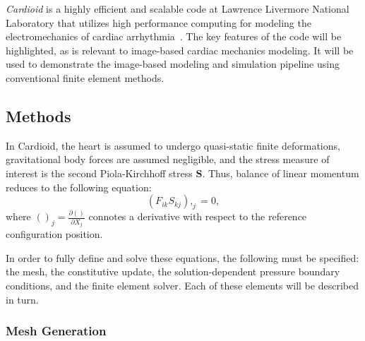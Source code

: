 \textit{Cardioid} is a highly efficient and scalable code at Lawrence Livermore National Laboratory that utilizes high performance computing for modeling the electromechanics of cardiac arrhythmia~\cite{richards_2013, gurev_2015}. The key features of the code will be highlighted, as is relevant to image-based cardiac mechanics modeling. It will be used to demonstrate the image-based modeling and simulation pipeline using conventional finite element methods.

\subsection{Methods}
\label{Methods}

In Cardioid, the heart is assumed to undergo quasi-static finite deformations, gravitational body forces are assumed negligible, and the stress measure of interest is the second Piola-Kirchhoff stress $\bm{S}$. Thus, balance of linear momentum reduces to the following equation:
\begin{equation}
(F_{ik}S_{kj}),_{j} = 0,
\end{equation}
where $()_j = \frac{\partial ()}{\partial X_j}$ connotes a derivative with respect to the reference configuration position.

In order to fully define and solve these equations, the following must be specified: the mesh, the constitutive update, the solution-dependent pressure boundary conditions, and the finite element solver. Each of these elements will be described in turn.

\subsubsection{Mesh Generation}
\label{Mesh Generation}

